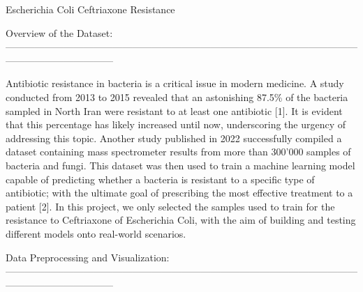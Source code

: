 \documentclass[100pt]{article}
\begin{document}
\setlength{\headsep}{35pt}
\fancyhf{}

\renewcommand\headrulewidth{0pt}
\pagestyle{fancy}

\begin{huge}
\begin{center}
\hfill\break
\hfill\break
\hfill\break
\hfill\break
\hfill\break
\hfill\break
\hfill\break
\hfill\break
Escherichia Coli Ceftriaxone Resistance
\break
\hfill\break
\hfill\break
\hfill\break
\hfill\break
\hfill\break
\hfill\break
\hfill\break
\hfill\break

\end{center}
\end{huge}


\begin{normalsize}\color {bluino}
\noindent Overview of the Dataset:\\
---------------------------------------------------------------------------------------------------------------------------------------------
\end{normalsize}

\begin{normalsize}

Antibiotic resistance in bacteria is a critical issue in modern medicine. A study conducted from 2013 to 2015 revealed that an astonishing 87.5\% of the bacteria sampled in North Iran were resistant to at least one antibiotic [1]. It is evident that this percentage has likely increased until now, underscoring the urgency of addressing this topic. Another study published in 2022 successfully compiled a dataset containing mass spectrometer results from more than 300'000 samples of bacteria and fungi. This dataset was then used to train a machine learning model capable of predicting whether a bacteria is resistant to a specific type of antibiotic; with the ultimate goal of prescribing the most effective treatment to a patient [2]. 
\indent In this project, we only selected the samples used to train for the resistance to Ceftriaxone of Escherichia Coli, with the aim of building and testing different models onto real-world scenarios. 

\end{normalsize}

\begin{normalsize}\color {bluino}
\hfill\break
\noindent Data Preprocessing and Visualization:\\
---------------------------------------------------------------------------------------------------------------------------------------------
\end{normalsize}
\end{document}
